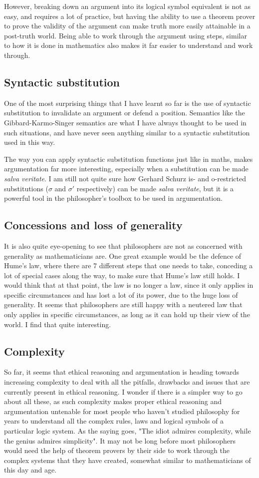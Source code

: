 \documentclass[11pt]{article}
\begin{document}
However, breaking down an argument into its logical symbol equivalent is not as easy, and requires a lot of practice, but having the ability to use a theorem prover to prove the validity of the argument can make truth more easily attainable in a post-truth world. Being able to work through the argument using steps, similar to how it is done in mathematics also makes it far easier to understand and work through.
\subsection{Syntactic substitution}
\label{sec:orgcc531e0}
One of the most surprising things that I have learnt so far is the use of syntactic substitution to invalidate an argument or defend a position. Semantics like the Gibbard-Karmo-Singer semantics are what I have always thought to be used in such situations, and have never seen anything similar to a syntactic substitution used in this way.

The way you can apply syntactic substitution functions just like in maths, makes argumentation far more interesting, especially when a substitution can be made \emph{salva veritate}. I am still not quite sure how Gerhard Schurz is- and o-restricted substitutions (\(\sigma\) and \(\sigma'\) respectively) can be made \emph{salva veritate}, but it is a powerful tool in the philosopher's toolbox to be used in argumentation.
\subsection{Concessions and loss of generality}
\label{sec:org0032190}
It is also quite eye-opening to see that philosophers are not as concerned with generality as mathematicians are. One great example would be the defence of Hume's law, where there are 7 different steps that one needs to take, conceding a lot of special cases along the way, to make sure that Hume's law still holds. I would think that at that point, the law is no longer a law, since it only applies in specific circumstances and has lost a lot of its power, due to the huge loss of generality. It seems that philosophers are still happy with a neutered law that only applies in specific circumstances, as long as it can hold up their view of the world. I find that quite interesting.
\subsection{Complexity}
\label{sec:org8aaf34f}
So far, it seems that ethical reasoning and argumentation is heading towards increasing complexity to deal with all the pitfalls, drawbacks and issues that are currently present in ethical reasoning. I wonder if there is a simpler way to go about all these, as such complexity makes proper ethical reasoning and argumentation untenable for most people who haven't studied philosophy for years to understand all the complex rules, laws and logical symbols of a particular logic system. As the saying goes, "The idiot admires complexity, while the genius admires simplicity". It may not be long before most philosophers would need the help of theorem provers by their side to work through the complex systems that they have created, somewhat similar to mathematicians of this day and age.
\end{document}
